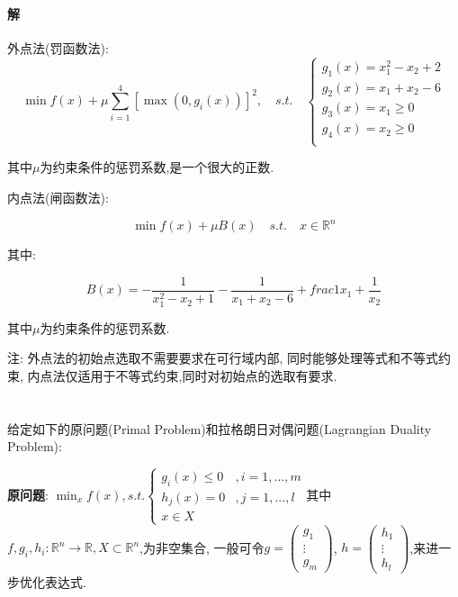 \documentclass[a4paper]{article}
\begin{document}
\paragraph{解}


外点法(罚函数法):
\[\min f(x) + \mu \sum_{i=1}^{4}[\max(0,g_i(x))]^2, \quad s.t. \quad \left\{\begin{array}{c}
   g_1(x) = x_1^2 - x_2+2  \\
   g_2(x)= x_1 + x_2 -6 \\
   g_3(x)= x_1 \geq 0 \\
    g_4(x) = x_2 \geq 0 \\
\end{array}\right.\]

其中$\mu$为约束条件的惩罚系数,是一个很大的正数.

内点法(闸函数法):

\[\min f(x) + \mu B(x) \quad s.t. \quad x \in \mathbb{R}^n\]

其中:

\[B(x) = -\frac{1}{x_1^2-x_2 + 1} - \frac{1}{x_1 + x_2 - 6}+ frac{1}{x_1}+\frac{1}{x_2}\]

其中$\mu$为约束条件的惩罚系数.

注: 外点法的初始点选取不需要要求在可行域内部, 同时能够处理等式和不等式约束, 内点法仅适用于不等式约束,同时对初始点的选取有要求.

\section{}
给定如下的原问题(Primal Problem)和拉格朗日对偶问题(Lagrangian Duality Problem): 

\textbf{原问题}: \(\min_x f(x), s.t. \left\{ \begin{array}{cc}
   g_i(x) \leq 0 &, i = 1,...,m\\
   h_j(x)=0&,j=1,...,l\\
   x \in X &
\end{array}\right.\)其中$f,g_i,h_i : \mathbb{R}^n \rightarrow \mathbb{R}, X \subset \mathbb{R}^n$,为非空集合, 一般可令\(g = \left(\begin{matrix}
   g_1 \\ \vdots  \\ g_m
\end{matrix}\right)\), \(h = \left(\begin{matrix}
   h_1 \\ \vdots \\ h_l
\end{matrix}\right)\),来进一步优化表达式.
\end{document}
